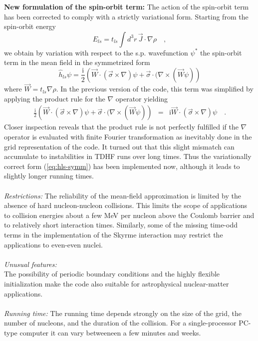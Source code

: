 \documentclass[final,1p,twocolumn]{elsarticle}
\newcounter{bla}
\begin{document}
\begin{small}
{\bf New formulation of the spin-orbit term:}
The action of the spin-orbit term has been corrected to comply with a
strictly variational form. Starting from the spin-orbit energy
\begin{equation}
  E_{ls}
  =
  t_{ls}\int d^3r\,\vec{J}\cdot\nabla\rho
  \quad,
\end{equation}
we obtain by variation with respect to the s.p. wavefunction $\psi^*$
the spin-orbit term in the mean field in the symmetrized form
\begin{equation}
  \hat{h}_{ls}\psi
  =
  \frac{\mathrm{i}}{2}\left(
   \vec{W}\cdot(\vec{\sigma}\times\nabla)\psi
   +
   \vec{\sigma}\cdot(\nabla\times(\vec{W}\psi)
 \right)
 \label{eq:hls-symm}
\end{equation}
where $\vec{W}=t_{ls}\nabla\rho$. In the previous version of the
code, this term was simplified by applying the product rule for the
$\nabla$ operator yielding
\begin{eqnarray}
  \frac{\mathrm{i}}{2}\left(
   \vec{W}\cdot(\vec{\sigma}\times\nabla)\psi
   +
   \vec{\sigma}\cdot(\nabla\times(\vec{W}\psi)
 \right)
 &=&
  \mathrm{i}\vec{W}\cdot(\vec{\sigma}\times\nabla)\psi
  \quad.
\end{eqnarray}
Closer inspection reveals that the product rule is not perfectly
fulfilled if the $\nabla$ operator is evaluated with finite Fourier
transformation as inevitably done in the grid representation of the
code. It turned out that this slight mismatch can accumulate to
instabilities in TDHF runs over long times. Thus the variationally
correct form (\ref{eq:hls-symm}) has been implemented now, although it
leads to slightly longer running times.\\ 
\\
{\em Restrictions:} The reliability of the mean-field approximation is
limited by the absence of hard nucleon-nucleon collisions. This limits
the scope of applications to collision energies about a few MeV per
nucleon above the Coulomb barrier and to relatively short interaction
times. Similarly, some of the missing time-odd terms in the implementation
of the Skyrme interaction may restrict the applications to even-even
nuclei.\\
\\
{\em Unusual features:}\\
The possibility of periodic boundary conditions and the highly
flexible initialization make the code also suitable for astrophysical
nuclear-matter applications.\\
   \\
{\em Running time:} The running time depends strongly on the size of
the grid, the number of nucleons, and the duration of the
collision. For a single-processor PC-type computer it can vary betweeneen
a few minutes and weeks.\\
   \\
\end{small}
 

\end{document}
